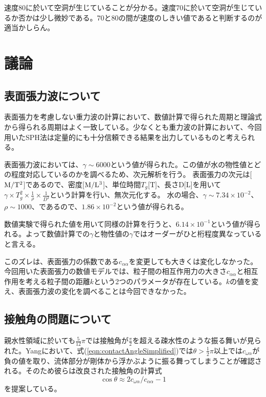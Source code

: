 \documentclass[]{jsarticle}
\begin{document}
速度80に於いて空洞が生じていることが分かる。速度70に於いて空洞が生じているか否かは少し微妙である。70と80の間が速度のしきい値であると判断するのが適当かしらん。
\newpage

\section{議論}
\subsection{表面張力波について}
\label{subsec:label}
表面張力を考慮しない重力波の計算において、数値計算で得られた周期と理論式から得られる周期はよく一致している。少なくとも重力波の計算において、今回用いたSPH法は定量的にも十分信頼できる結果を出力しているものと考えられる。

表面張力波においては、$\gamma\sim 6000$という値が得られた。この値が水の物性値とどの程度対応しているのかを調べるため、次元解析を行う。
表面張力の次元は[$\rm{M/T^2}$]であるので、密度[$\rm{M/L^3}$]、単位時間$T_g$[T]、長さD[L]を用いて$\gamma\times T_g^2 \times \frac{1}{\rho} \times \frac{1}{D^3}$という計算を行い、無次元化する。
水の場合、$\gamma\sim 7.34\times 10^{-2}$、$\rho\sim 1000$、であるので、$1.86\times 10^{-2}$という値が得られる。

数値実験で得られた値を用いて同様の計算を行うと、$6.14\times 10^{-1}$という値が得られる。よって数値計算での$\gamma$と物性値の$\gamma$ではオーダーがひと桁程度異なっていると言える。

このズレは、表面張力の係数である$c_{\alpha\alpha}$を変更しても大きくは変化しなかった。
今回用いた表面張力の数値モデルでは、粒子間の相互作用力の大きさ$c_{\alpha\alpha}$と相互作用を考える粒子間の距離$k$という2つのパラメータが存在している。$k$の値を変え、表面張力波の変化を調べることは今回できなかった。


\subsection{接触角の問題について}
\label{subsec:discContact}
親水性領域に於いても$\frac{5}{12}\pi$では接触角が$\frac{\pi}{2}$を超える疎水性のような振る舞いが見られた。Yang\cite{Yang2017}において、式(\ref{eqn:contactAngleSimplified})では$\theta>\frac{1}{2}\pi$以上では$c_{\omega\alpha}$が負の値を取り、流体部分が剛体から浮かぶように振る舞ってしまうことが確認される。そのため彼らは改良された接触角の計算式
\begin{equation}
  \label{eqn:modifiedContactAngle}
\cos \theta \approx 2c_{\omega\alpha}/c_{\alpha\alpha} -1
\end{equation}
を提案している。
\end{document}
